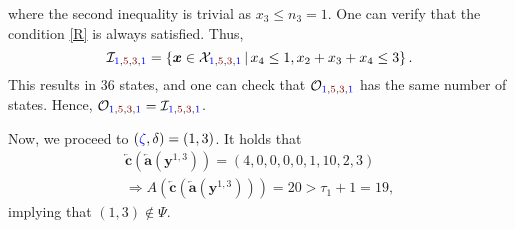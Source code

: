 \documentclass[10 pt,twocolumn,journal]{IEEEtran}
\theoremstyle{plain}
\newcommand{\I}{\mathcal{I}}
\newcommand{\X}{\mathcal{X}}
\newcommand{\x}{\bm{x}}
\newcommand{\y}{\bm{y}}
\renewcommand{\a}{\bm{a}}
\renewcommand{\c}{\bm{c}}
\renewcommand{\r}{\tb{\zeta}}
\renewcommand{\d}{{\delta}}
\newcommand{\tb}{\textcolor{blue}}
\newcommand{\tr}{\textcolor{Myred}}
\theoremstyle{definition}
\begin{document}
where the second inequality is trivial as $x_3\leq n_3 = 1$.
One can verify that the condition \eqref{R} is always satisfied.
Thus, 
\begin{equation*}
    \I_{\tb{1},\tr{5},\tr{3},\tb{1}}
    = \left\{ \x\in\X_{\tb{1}, \tr{5}, \tr{3}, \tb{1}}\,|\,
        x_4\leq1, 
        x_2 + x_3 + x_4 \leq 3
    \right\}.
\end{equation*}
This results in 36 states, and one can check that $\mathcal{O}_{\tb{1}, \tr{5}, \tr{3}, \tb{1}}$ has the same number of states.
Hence,  $\mathcal{O}_{\tb{1}, \tr{5}, \tr{3}, \tb{1}}=\I_{\tb{1},\tr{5},\tr{3},\tb{1}} $.

Now, we proceed to $(\r,\d) = (1,3)$. 
It holds that
\begin{gather*}
    \overleftarrow{\c}(\overleftarrow{\a}(\y^{1,3})) 
    = (4,0,0,0,0,1,10,2,3)\\
    \Rightarrow
    A(\overleftarrow{\c}(\overleftarrow{\a}(\y^{1,3}))) = 20 > {\tau_1} + 1 = 19,
\end{gather*}
implying that $(1,3)\not\in\Psi$.
\end{document}
